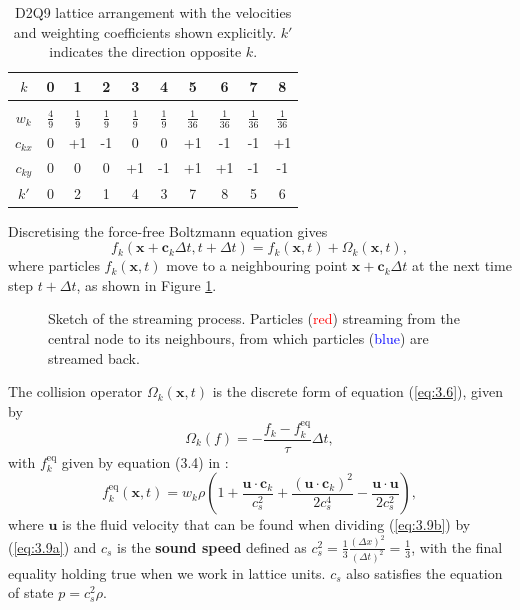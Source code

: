 \documentclass[a4paper, 11pt]{report}
\begin{document}
\begin{table} [!htb]
\centering
    \begin{tabular}{c||c|c|c|c|c|c|c|c|c}
    \hline
    $k$ & 0 & 1 & 2 & 3 & 4 & 5 & 6 & 7 & 8  \\
    \hline
    & & & & & & & & &\\ [-2ex]
    $w_k$ & $\frac{4}{9}$ & $\frac{1}{9}$ & $\frac{1}{9}$ & $\frac{1}{9}$ & $\frac{1}{9}$ & $\frac{1}{36}$ & $\frac{1}{36}$ & $\frac{1}{36}$ & $\frac{1}{36}$ \\ [1ex]
    \hline
    $c_{kx}$ & 0 & +1 & -1 & 0 & 0 & +1 & -1 & -1 & +1 \\
    \hline
    $c_{ky}$ & 0 & 0 & 0 & +1 & -1 & +1 & +1 & -1 & -1 \\
    \hline
    $k'$ & 0 & 2 & 1 & 4 & 3 & 7 & 8 & 5 & 6 \\
    \hline
    \end{tabular}
    \caption{D2Q9 lattice arrangement with the velocities and weighting coefficients shown explicitly. $k'$ indicates the direction opposite $k$.}
    \label{table:d2q9}
\end{table}
\newpage
Discretising the force-free Boltzmann equation gives
\begin{equation}
    f_k(\mathbf{x} + \mathbf{c}_k\Delta t, t + \Delta t) = f_k(\mathbf{x}, t) + \Omega_k(\mathbf{x}, t), \label{eq:3.10} 
\end{equation}
where particles $f_k(\mathbf{x},t)$ move to a neighbouring point $\mathbf{x} + \mathbf{c}_k\Delta t$ at the next time step $t + \Delta t$, as shown in Figure \ref{fig:stream}.

\begin{figure}[!htb]
\centering

\caption[Sketch of the streaming process]{Sketch of the streaming process. Particles (\textcolor{red}{red}) streaming from the central node to its neighbours, from which particles (\textcolor{blue}{blue}) are streamed back.}
\label{fig:stream}
\end{figure}

The collision operator $\Omega_k(\mathbf{x},t)$ is the discrete form of equation (\ref{eq:3.6}), given by
\begin{equation}
    \Omega_k(f) = -\frac{f_k - f_k^{\mathrm{eq}}}{\tau}\Delta t, \label{eq:3.11}
\end{equation}
with $f_k^{\mathrm{eq}}$ given by equation (3.4) in \cite{lbtextbook}:
\begin{equation}
    f_k^{\mathrm{eq}}(\mathbf{x},t) = w_k\rho \left( 1 + \frac{\mathbf{u}\cdot\mathbf{c}_k}{c_s^2} + \frac{(\mathbf{u}\cdot\mathbf{c}_k)^2}{2c_s^4} - \frac{\mathbf{u}\cdot\mathbf{u}}{2c_s^2}\right), \label{eq:3.12}
\end{equation}
where $\mathbf{u}$ is the fluid velocity that can be found when dividing (\ref{eq:3.9b}) by (\ref{eq:3.9a}) and $c_s$ is the \textbf{sound speed} defined as $c_s^2 = \frac{1}{3}\frac{(\Delta x)^2}{(\Delta t)^2} = \frac{1}{3}$, with the final equality holding true when we work in lattice units. $c_s$ also satisfies the equation of state $p = c_s^2\rho$. 
\end{document}
